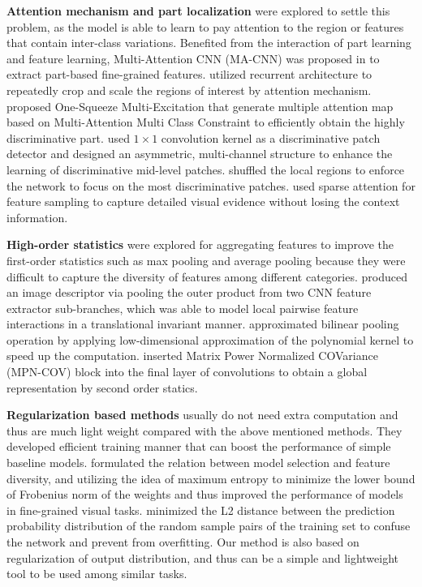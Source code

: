 \documentclass{article}
\theoremstyle{definition}
\begin{document}
\textbf{Attention mechanism and part localization} were explored to settle this problem, as the model is able to learn to pay attention to the region or features that contain inter-class variations. Benefited from the interaction of part learning and feature learning, Multi-Attention CNN (MA-CNN) was proposed in \cite{zheng2017learning} to extract part-based fine-grained features. 
\cite{fu2017look} utilized recurrent architecture to repeatedly crop and scale the regions of interest by attention mechanism.
\cite{sun2018multi} proposed One-Squeeze Multi-Excitation that generate multiple attention map based on Multi-Attention Multi Class Constraint to efficiently obtain the highly discriminative part.
\cite{wang2018learning} used $1\times1$ convolution kernel as a discriminative patch detector and designed an asymmetric, multi-channel structure to enhance the learning of discriminative mid-level patches.
\cite{chen2019destruction} shuffled the local regions to enforce the network to focus on the most discriminative patches.
\cite{ding2019selective} used sparse attention for feature sampling to capture detailed visual evidence without losing the context information.


\textbf{High-order statistics} were explored for aggregating features to improve the first-order statistics such as max pooling and average pooling because they were difficult to capture the diversity of features among different categories.
\cite{lin2015bilinear} produced an image descriptor via pooling the outer product from two CNN feature extractor sub-branches, which was able to model local pairwise feature interactions in a translational invariant manner.
\cite{gao2016compact} approximated bilinear pooling operation by applying low-dimensional approximation of the polynomial kernel to speed up the computation.
\cite{wang2019deep} inserted Matrix Power Normalized COVariance (MPN-COV) block into the final layer of convolutions to obtain a global representation by second order statics. 

\textbf{Regularization based methods} usually do not need extra computation and thus are much light weight compared with the above mentioned methods. They developed efficient training manner that can boost the performance of simple baseline models. \cite{dubey2018maximum} formulated the relation between model selection and feature diversity, and utilizing the idea of maximum entropy to minimize the lower bound of Frobenius norm of the weights and thus improved the performance of models in fine-grained visual tasks. \cite{dubey2018pairwise} minimized the L2 distance between the prediction probability distribution of the random sample pairs of the training set to confuse the network and prevent from overfitting. Our method is also based on regularization of output distribution, and thus can be a simple and lightweight tool to be used among similar tasks.
\end{document}
